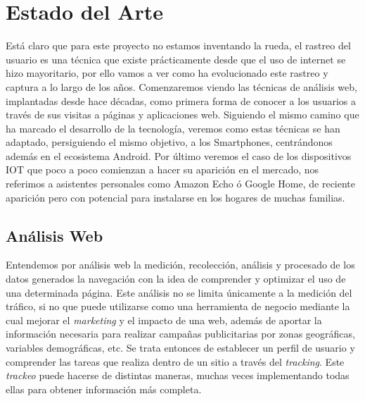 \documentclass[12pt,a4paper,oneside]{book} %
\begin{document}
\chapter{Estado del Arte}
Está claro que para este proyecto no estamos inventando la rueda, el rastreo del usuario es una técnica que existe prácticamente desde que el uso de internet se hizo mayoritario, por ello vamos a ver como ha evolucionado este rastreo y captura a lo largo de los años. 
\newline \newline 
Comenzaremos viendo las técnicas de análisis web, implantadas desde hace décadas, como primera forma de conocer a los usuarios a través de sus visitas a páginas y aplicaciones web. 
\newline \newline
Siguiendo el mismo camino que ha marcado el desarrollo de la tecnología, veremos como estas técnicas se han adaptado, persiguiendo el mismo objetivo, a los Smartphones, centrándonos además en el ecosistema Android. 
\newline \newline 
Por último veremos el caso de los dispositivos IOT que poco a poco comienzan a hacer su aparición en el mercado, nos referimos a asistentes personales como Amazon Echo ó Google Home, de reciente aparición pero con potencial para instalarse en los hogares de muchas familias.
\newpage 
\section{Análisis Web}
Entendemos por análisis web la medición, recolección, análisis y procesado de los datos generados  la  navegación  con la idea de comprender y optimizar el uso de una determinada página. 
\newline \newline
Este análisis no se limita únicamente a la medición del tráfico, si no que puede utilizarse como una herramienta de negocio mediante la cual mejorar el \textit{marketing} y el impacto de una web, además de aportar la información necesaria para realizar campañas publicitarias por zonas geográficas, variables demográficas, etc. Se trata entonces de establecer un perfil de usuario y comprender las tareas que realiza dentro de un sitio a través del \textit{tracking}. Este \textit{trackeo} puede hacerse de distintas maneras, muchas veces implementando todas ellas para obtener información más completa.
\end{document}
